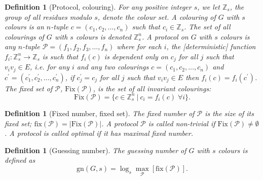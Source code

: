 \documentclass{birkjour}
\theoremstyle{indenteddefinition}
\newtheorem{defn}[thm]{Definition}
\theoremstyle{indenteddefinition}
\numberwithin{equation}{section}
\renewcommand{\Pr}{\mathcal{P}}
\newcommand{\Z}{\mathbb{Z}}
\newcommand{\fix}{\mbox{fix}}
\newcommand{\gn}{\mbox{gn}}
\newcommand{\Fix}{\mbox{Fix}}
\begin{document}
\begin{defn}[Protocol, colouring]
\label{defn:prot}
For any positive integer $s$, we let $\Z_s$, the group of all residues modulo $s$, denote the \emph{colour set}. 
A \emph{colouring} of $G$ with $s$ colours is an $n$-tuple $c = (c_1,c_2, \ldots ,c_n)$ such that $c_i \in \Z_s$. 
The set of all colourings of $G$ with $s$ colours is denoted $\Z_s^n$. 
A \emph{protocol} on  $G$ with $s$ colours is any $n$-tuple $\Pr = (f_1,f_2,f_3, \ldots ,f_n)$ where for each $i$, the [deterministic] function $f_i : \Z_s^n \rightarrow \Z_s$ is such that $f_i(c)$ is dependent only on $c_j$ for all $j$ such that $v_iv_j \in E$, {\it i.e.}
for any $i$ and any two colourings $c = (c_1,c_2, \ldots ,c_n)$ and $c^\prime = (c_1^\prime,c_2^\prime,\ldots ,c_n^\prime)$, if $c_j^\prime = c_j$ for all $j$ such that $v_iv_j \in E$ then $f_i(c) = f_i(c^\prime)$. The \emph{fixed set} of $\Pr$, $\Fix(\Pr)$, is the set of all invariant colourings:
	$$ \Fix(\Pr) = \big\{ c \in \Z_s^n \: | \: c_i=f_i(c) \; \forall i \big\}. $$
	\end{defn}
\begin{defn}[Fixed number, fixed set]
\label{defn:gn} 
The \emph{fixed number} of $\Pr$ is the size of its fixed set; $\fix(\Pr) = |\Fix(\Pr)|$. 
A protocol $\Pr$ is called \emph{non-trivial} if $\Fix(\Pr) \not= \emptyset$. 
A protocol is called \emph{optimal} if it has maximal fixed number. 
\end{defn}
\begin{defn}[Guessing number]
\label{defn:fixed} 
The \emph{guessing number} of $G$ with $s$ colours is defined as
	$$ \gn(G,s) = \log_s \max_\Pr \left[ \fix(\Pr) \right]. $$
\end{defn}
\end{document}
